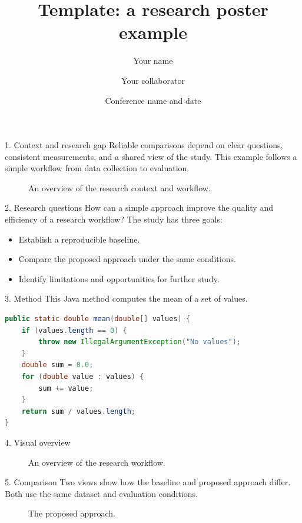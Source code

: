 \documentclass[11pt]{beamer}
\title{Template: a research poster example}
\author{Your name \and Your collaborator}
\institute{Your research team --- Your university or organisation}
\date{Conference name and date}
\begin{document}
\begin{frame}[fragile,t]
  \begin{colorblock}{1. Context and research gap}
    Reliable comparisons depend on clear questions, consistent
    measurements, and a shared view of the study. This example follows
    a simple workflow from data collection to evaluation.
    \begin{figure}
      \caption{An overview of the research context and workflow.}
    \end{figure}
  \end{colorblock}

  \begin{colorblock}{2. Research questions}
    How can a simple approach improve the quality and efficiency of a
    research workflow? The study has three goals:
    \begin{itemize}
      \item Establish a reproducible baseline.
      \item Compare the proposed approach under the same conditions.
      \item Identify limitations and opportunities for further study.
    \end{itemize}
  \end{colorblock}

  \begin{colorblock}{3. Method}
    This Java method computes the mean of a set of values.
\begin{lstlisting}[language=Java,xleftmargin=2em]
public static double mean(double[] values) {
    if (values.length == 0) {
        throw new IllegalArgumentException("No values");
    }
    double sum = 0.0;
    for (double value : values) {
        sum += value;
    }
    return sum / values.length;
}
\end{lstlisting}
  \end{colorblock}

  \begin{colorblock*}{4. Visual overview}
    \begin{figure}
      \caption{An overview of the research workflow.}
    \end{figure}
  \end{colorblock*}

  \begin{colorblock}{5. Comparison}
    Two views show how the baseline and proposed approach differ.
    Both use the same dataset and evaluation conditions.
    \begin{figure}
      \begin{minipage}[t]{0.48\linewidth}
        \caption{The reference approach.}
      \end{minipage}\hfill
      \begin{minipage}[t]{0.48\linewidth}
        \caption{The proposed approach.}
      \end{minipage}
    \end{figure}
  \end{colorblock}


\end{frame}
\end{document}
